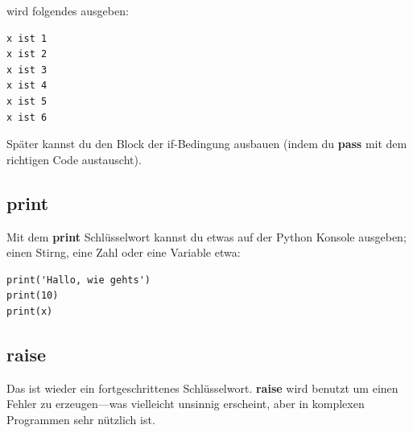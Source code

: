 \noindent
wird folgendes ausgeben:

\begin{Verbatim}[frame=single]
x ist 1
x ist 2
x ist 3
x ist 4
x ist 5
x ist 6
\end{Verbatim}

\noindent
Später kannst du den Block der if-Bedingung ausbauen (indem du \textbf{pass} mit dem richtigen Code austauscht).

\subsection*{print}

Mit dem \textbf{print} Schlüsselwort kannst du etwas auf der Python Konsole ausgeben; einen Stirng, eine Zahl oder eine Variable etwa:

\begin{Verbatim}[frame=single]
print('Hallo, wie gehts')
print(10)
print(x)
\end{Verbatim}

\subsection*{raise}

Das ist wieder ein fortgeschrittenes Schlüsselwort. \textbf{raise} wird benutzt um einen Fehler zu erzeugen---was vielleicht unsinnig erscheint, aber in komplexen Programmen sehr nützlich ist.


